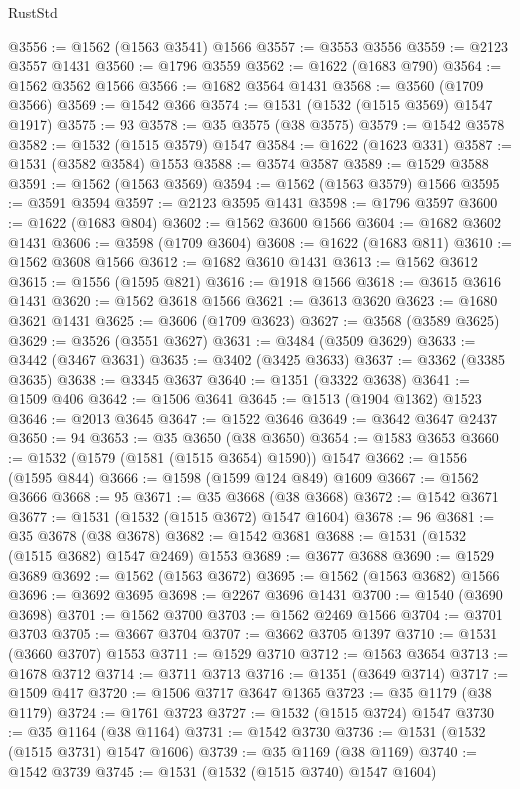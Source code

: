 \begin{lexlean}{RustStd}
\begin{coremodule}
@3556 := @1562 (@1563 @3541) @1566
@3557 := @3553 @3556
@3559 := @2123 @3557 @1431
@3560 := @1796 @3559
@3562 := @1622 (@1683 @790)
@3564 := @1562 @3562 @1566
@3566 := @1682 @3564 @1431
@3568 := @3560 (@1709 @3566)
@3569 := @1542 @366
@3574 := @1531 (@1532 (@1515 @3569) @1547 @1917)
@3575 := 93
@3578 := @35 @3575 (@38 @3575)
@3579 := @1542 @3578
@3582 := @1532 (@1515 @3579) @1547
@3584 := @1622 (@1623 @331)
@3587 := @1531 (@3582 @3584) @1553
@3588 := @3574 @3587
@3589 := @1529 @3588
@3591 := @1562 (@1563 @3569)
@3594 := @1562 (@1563 @3579) @1566
@3595 := @3591 @3594
@3597 := @2123 @3595 @1431
@3598 := @1796 @3597
@3600 := @1622 (@1683 @804)
@3602 := @1562 @3600 @1566
@3604 := @1682 @3602 @1431
@3606 := @3598 (@1709 @3604)
@3608 := @1622 (@1683 @811)
@3610 := @1562 @3608 @1566
@3612 := @1682 @3610 @1431
@3613 := @1562 @3612
@3615 := @1556 (@1595 @821)
@3616 := @1918 @1566
@3618 := @3615 @3616 @1431
@3620 := @1562 @3618 @1566
@3621 := @3613 @3620
@3623 := @1680 @3621 @1431
@3625 := @3606 (@1709 @3623)
@3627 := @3568 (@3589 @3625)
@3629 := @3526 (@3551 @3627)
@3631 := @3484 (@3509 @3629)
@3633 := @3442 (@3467 @3631)
@3635 := @3402 (@3425 @3633)
@3637 := @3362 (@3385 @3635)
@3638 := @3345 @3637
@3640 := @1351 (@3322 @3638)
@3641 := @1509 @406
@3642 := @1506 @3641
@3645 := @1513 (@1904 @1362) @1523
@3646 := @2013 @3645
@3647 := @1522 @3646
@3649 := @3642 @3647 @2437
@3650 := 94
@3653 := @35 @3650 (@38 @3650)
@3654 := @1583 @3653
@3660 := @1532 (@1579 (@1581 (@1515 @3654) @1590)) @1547
@3662 := @1556 (@1595 @844)
@3666 := @1598 (@1599 @124 @849) @1609
@3667 := @1562 @3666
@3668 := 95
@3671 := @35 @3668 (@38 @3668)
@3672 := @1542 @3671
@3677 := @1531 (@1532 (@1515 @3672) @1547 @1604)
@3678 := 96
@3681 := @35 @3678 (@38 @3678)
@3682 := @1542 @3681
@3688 := @1531 (@1532 (@1515 @3682) @1547 @2469) @1553
@3689 := @3677 @3688
@3690 := @1529 @3689
@3692 := @1562 (@1563 @3672)
@3695 := @1562 (@1563 @3682) @1566
@3696 := @3692 @3695
@3698 := @2267 @3696 @1431
@3700 := @1540 (@3690 @3698)
@3701 := @1562 @3700
@3703 := @1562 @2469 @1566
@3704 := @3701 @3703
@3705 := @3667 @3704
@3707 := @3662 @3705 @1397
@3710 := @1531 (@3660 @3707) @1553
@3711 := @1529 @3710
@3712 := @1563 @3654
@3713 := @1678 @3712
@3714 := @3711 @3713
@3716 := @1351 (@3649 @3714)
@3717 := @1509 @417
@3720 := @1506 @3717 @3647 @1365
@3723 := @35 @1179 (@38 @1179)
@3724 := @1761 @3723
@3727 := @1532 (@1515 @3724) @1547
@3730 := @35 @1164 (@38 @1164)
@3731 := @1542 @3730
@3736 := @1531 (@1532 (@1515 @3731) @1547 @1606)
@3739 := @35 @1169 (@38 @1169)
@3740 := @1542 @3739
@3745 := @1531 (@1532 (@1515 @3740) @1547 @1604)

\end{coremodule}
\end{lexlean}
